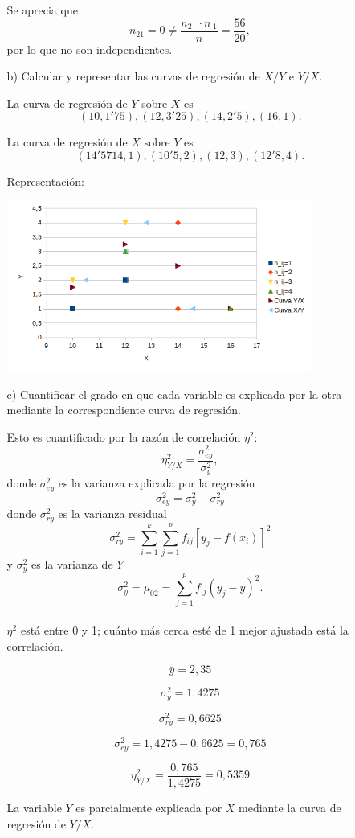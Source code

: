 \documentclass[10pt,a4paper]{article}
\begin{document}
\begin{enumerate}
\begin{itemize}
Se aprecia que $$n_{21} = 0 \not = \frac{n_{2\cdot}\cdot n_{\cdot 1}}{n} = \frac{56}{20},$$ por lo que no son independientes.

\item[b)]Calcular y representar las curvas de regresión de $X/Y$ e $Y/X$.

La curva de regresión de $Y$ sobre $X$ es $$(10,1'75), (12,3'25), (14,2'5), (16,1).$$

La curva de regresión de $X$ sobre $Y$ es  $$(14'5714,1), (10'5,2), (12,3), (12'8,4).$$

Representación:

\includegraphics[width=10cm]{graficoe6.png}

\item[c)]Cuantificar el grado en que cada variable es explicada por la otra mediante la correspondiente curva de regresión.

Esto es cuantificado por la razón de correlación $\eta^2$: $$\eta^2_{Y/X} = \frac{\sigma^2_{ey}}{\sigma^2_y},$$ donde $\sigma^2_{ey}$ es la varianza explicada por la regresión $$\sigma^2_{ey} = \sigma^2_y - \sigma^2_{ry}$$ donde $\sigma^2_{ry}$ es la varianza residual $$\sigma^2_{ry} = \sum_{i=1}^k \sum_{j=1}^p f_{ij} [y_j - f(x_i)]^2$$ y $\sigma^2_y$ es la varianza de $Y$ $$\sigma^2_y = \mu_{02} = \sum_{j=1}^p f_{\cdot j}(y_j-\bar y)^2.$$
\\$\eta^2$ está entre 0 y 1; cuánto más cerca esté de 1 mejor ajustada está la correlación.

$$\bar y = 2,35$$

$$\sigma^2_y = 1,4275$$

$$\sigma^2_{ry} = 0,6625$$

$$\sigma^2_{ey} = 1,4275 - 0,6625 = 0,765$$

$$\eta^2_{Y/X} = \frac{0,765}{1,4275} = 0,5359$$

La variable $Y$ es parcialmente explicada por $X$ mediante la curva de regresión de $Y/X$.


\end{itemize}
\end{enumerate}
\end{document}
